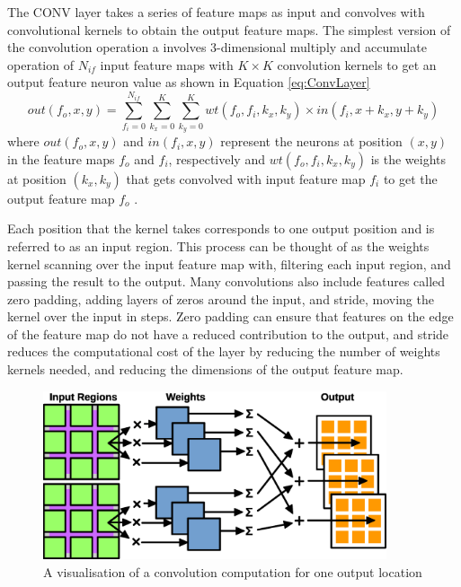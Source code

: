 \documentclass[12pt]{article}
\begin{document}
The CONV layer takes a series of feature maps as input and convolves with convolutional kernels to obtain the output feature maps. The simplest version of the convolution operation a involves 3-dimensional multiply and accumulate operation of $N_{if}$ input feature maps with $K\times K$ convolution kernels to get an output feature neuron value as shown in Equation \ref{eq:ConvLayer}
\begin{equation}
out(f_o,x,y)=\sum^{N_{if}}_{f_i=0} \sum^{K}_{k_x=0} \sum^{K}_{k_y=0} wt(f_o,f_i,k_x,k_y)\times in(f_i,x+k_x,y+k_y)
\label{eq:ConvLayer}
\end{equation}
where $out(f_o,x,y)$ and $in(f_i,x,y)$ represent the neurons at position $(x,y)$ in the feature maps $f_o$ and $f_i$, respectively and $wt(f_o,f_i,k_x,k_y)$ is the weights at position $(k_x,k_y)$ that gets convolved with input feature map $f_i$ to get the output feature map $f_o$ \cite{SudaFpgaAccelerator}.

Each position that the kernel takes corresponds to one output position and is referred to as an input region. This process can be thought of as the weights kernel scanning over the input feature map with, filtering each input region, and passing the result to the output. Many convolutions also include features called zero padding, adding layers of zeros around the input, and stride, moving the kernel over the input in steps. Zero padding can ensure that features on the edge of the feature map do not have a reduced contribution to the output, and stride reduces the computational cost of the layer by reducing the number of weights kernels needed, and reducing the dimensions of the output feature map.

\begin{figure}[h]
\centering
\includegraphics[width=0.9\textwidth]{figures/conv.eps}
\caption{A visualisation of a convolution computation for one output location}
\label{fig:conv}
\end{figure}
\end{document}

